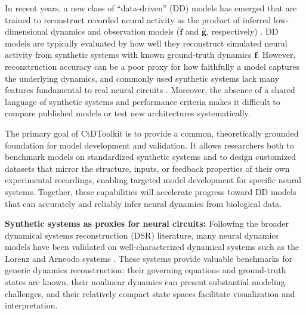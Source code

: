 \documentclass{article}
\begin{document}
In recent years, a new class of “data-driven” (DD) models has emerged that are trained to reconstruct recorded neural activity as the product of inferred low-dimensional dynamics and observation models ($\hat{\mathbf{f}}$ and $\mathbf{\hat{g}}$, respectively) \cite{gao_linear_2016, zhao2017variational, linderman2017bayesian, pandarinath_inferring_2018, schimel_ilqr-vae_2021, kim2021inferring, dinc2023cornn, NEURIPS2022_9877d915, Kim2023FlowField, zoltowski2020general, smith_reverse_2021, Abbaspourazad2023DynamicalFlexible, Koppe2019PLRNN, Hurwitz2021TNDM, Langdon2025-yu}. DD models are typically evaluated by how well they reconstruct simulated neural activity from synthetic systems with known ground-truth dynamics $\mathbf{f}$. However, reconstruction accuracy can be a poor proxy for how faithfully a model captures the underlying dynamics, and commonly used synthetic systems lack many features fundamental to real neural circuits \cite{ostrow_dsa, versteeg2023expressive, kim2021inferring}. Moreover, the absence of a shared language of synthetic systems and performance criteria makes it difficult to compare published models or test new architectures systematically.

The primary goal of CtDToolkit is to provide a common, theoretically grounded foundation for model development and validation. It allows researchers both to benchmark models on standardized synthetic systems and to design customized datasets that mirror the structure, inputs, or feedback properties of their own experimental recordings, enabling targeted model development for specific neural systems. Together, these capabilities will accelerate progress toward DD models that can accurately and reliably infer neural dynamics from biological data.

\textbf{Synthetic systems as proxies for neural circuits: \label{sec:syn_systems}} Following the broader dynamical systems reconstruction (DSR) literature, many neural dynamics models have been validated on well-characterized dynamical systems such as the Lorenz and Arneodo systems \cite{lorenz1963deterministic, gao_linear_2016, pandarinath_inferring_2018, zhao2017variational, kim2021inferring, schimel_ilqr-vae_2021, smith_reverse_2021, sedler_expressive_2022, versteeg2023expressive}. These systems provide valuable benchmarks for generic dynamics reconstruction: their governing equations and ground-truth states are known, their nonlinear dynamics can present substantial modeling challenges, and their relatively compact state spaces facilitate visualization and interpretation.
\end{document}
